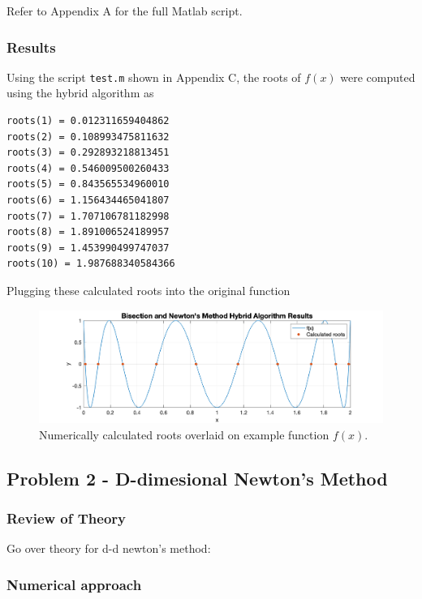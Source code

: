 \documentclass[10pt]{article}
\def\code#1{\texttt{#1}}
\begin{document}
Refer to Appendix A for the full Matlab script.

\subsubsection*{Results}

Using the script \code{test.m} shown in Appendix C, the roots of $f(x)$ were computed using the hybrid algorithm
as 
\begin{verbatim}
roots(1) = 0.012311659404862
roots(2) = 0.108993475811632
roots(3) = 0.292893218813451
roots(4) = 0.546009500260433 
roots(5) = 0.843565534960010 
roots(6) = 1.156434465041807
roots(7) = 1.707106781182998
roots(8) = 1.891006524189957
roots(9) = 1.453990499747037
roots(10) = 1.987688340584366
\end{verbatim}

Plugging these calculated roots into the original function 

\begin{figure}[h!]
\centering
\includegraphics[width=1\textwidth]{HybridPlot.png}
\caption{Numerically calculated roots overlaid on example function $f(x)$.}
\end{figure}

\pagebreak

\subsection*{Problem 2 - D-dimesional Newton's Method}

\subsubsection*{Review of Theory}
Go over theory for d-d newton's method: 

\subsubsection*{Numerical approach}
\end{document}

